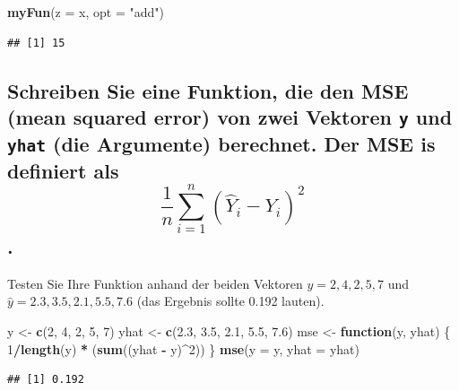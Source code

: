 \documentclass[12pt,a4paper]{article}
\newenvironment{Shaded}{\begin{snugshade}}{\end{snugshade}}
\newcommand{\AttributeTok}[1]{\textcolor[rgb]{0.13,0.29,0.53}{#1}}
\newcommand{\ControlFlowTok}[1]{\textcolor[rgb]{0.13,0.29,0.53}{\textbf{#1}}}
\newcommand{\DecValTok}[1]{\textcolor[rgb]{0.00,0.00,0.81}{#1}}
\newcommand{\FloatTok}[1]{\textcolor[rgb]{0.00,0.00,0.81}{#1}}
\newcommand{\FunctionTok}[1]{\textcolor[rgb]{0.13,0.29,0.53}{\textbf{#1}}}
\newcommand{\NormalTok}[1]{#1}
\newcommand{\OtherTok}[1]{\textcolor[rgb]{0.56,0.35,0.01}{#1}}
\newcommand{\SpecialCharTok}[1]{\textcolor[rgb]{0.81,0.36,0.00}{\textbf{#1}}}
\newcommand{\StringTok}[1]{\textcolor[rgb]{0.31,0.60,0.02}{#1}}
\begin{document}
\begin{Shaded}
\begin{Highlighting}[]
    \FunctionTok{myFun}\NormalTok{(}\AttributeTok{z =}\NormalTok{ x, }\AttributeTok{opt =} \StringTok{"add"}\NormalTok{)}
\end{Highlighting}
\end{Shaded}

\begin{verbatim}
## [1] 15
\end{verbatim}

\subsection{\texorpdfstring{Schreiben Sie eine Funktion, die den MSE
(mean squared error) von zwei Vektoren \texttt{y} und \texttt{yhat} (die
Argumente) berechnet. Der MSE is definiert als
\[\displaystyle \frac{1}{n}\sum_{i=1}^n (\hat{Y}_i - Y_i)^2\].}{Schreiben Sie eine Funktion, die den MSE (mean squared error) von zwei Vektoren y und yhat (die Argumente) berechnet. Der MSE is definiert als \textbackslash displaystyle \textbackslash frac\{1\}\{n\}\textbackslash sum\_\{i=1\}\^{}n (\textbackslash hat\{Y\}\_i - Y\_i)\^{}2.}}\label{schreiben-sie-eine-funktion-die-den-mse-mean-squared-error-von-zwei-vektoren-y-und-yhat-die-argumente-berechnet.-der-mse-is-definiert-als-displaystyle-frac1nsum_i1n-haty_i---y_i2.}

Testen Sie Ihre Funktion anhand der beiden Vektoren
\(y = {2, 4, 2, 5, 7}\) und \(\hat{y}= {2.3, 3.5, 2.1, 5.5, 7.6}\) (das
Ergebnis sollte 0.192 lauten).

\begin{Shaded}
\begin{Highlighting}[]
\NormalTok{    y    }\OtherTok{\textless{}{-}} \FunctionTok{c}\NormalTok{(}\DecValTok{2}\NormalTok{, }\DecValTok{4}\NormalTok{, }\DecValTok{2}\NormalTok{, }\DecValTok{5}\NormalTok{, }\DecValTok{7}\NormalTok{)}
\NormalTok{    yhat }\OtherTok{\textless{}{-}} \FunctionTok{c}\NormalTok{(}\FloatTok{2.3}\NormalTok{, }\FloatTok{3.5}\NormalTok{, }\FloatTok{2.1}\NormalTok{, }\FloatTok{5.5}\NormalTok{, }\FloatTok{7.6}\NormalTok{)}
\NormalTok{    mse }\OtherTok{\textless{}{-}} \ControlFlowTok{function}\NormalTok{(y, yhat) \{}
      \DecValTok{1}\SpecialCharTok{/}\FunctionTok{length}\NormalTok{(y) }\SpecialCharTok{*}\NormalTok{ (}\FunctionTok{sum}\NormalTok{((yhat }\SpecialCharTok{{-}}\NormalTok{ y)}\SpecialCharTok{\^{}}\DecValTok{2}\NormalTok{))}
\NormalTok{    \}}
    \FunctionTok{mse}\NormalTok{(}\AttributeTok{y =}\NormalTok{ y, }\AttributeTok{yhat =}\NormalTok{ yhat)}
\end{Highlighting}
\end{Shaded}

\begin{verbatim}
## [1] 0.192
\end{verbatim}
\end{document}
